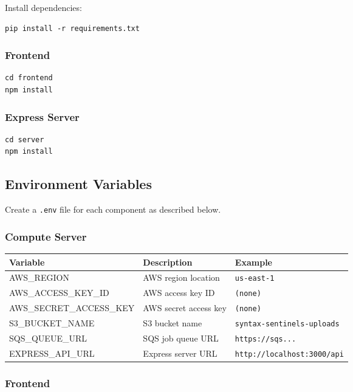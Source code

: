 \documentclass{article}
\begin{document}
Install dependencies:
\begin{Verbatim}[fontsize=\small]
pip install -r requirements.txt
\end{Verbatim}

\subsubsection*{Frontend}

\begin{Verbatim}[fontsize=\small]
cd frontend
npm install
\end{Verbatim}

\subsubsection*{Express Server}

\begin{Verbatim}[fontsize=\small]
cd server
npm install
\end{Verbatim}

\subsection{Environment Variables}

Create a \texttt{.env} file for each component as described below.

\subsubsection*{Compute Server}

\begin{tabularx}{\textwidth}{lXl}
\toprule
\textbf{Variable} & \textbf{Description} & \textbf{Example} \\
\midrule
AWS\_REGION & AWS region location & \texttt{us-east-1} \\
AWS\_ACCESS\_KEY\_ID & AWS access key ID & \texttt{(none)} \\
AWS\_SECRET\_ACCESS\_KEY & AWS secret access key & \texttt{(none)} \\
S3\_BUCKET\_NAME & S3 bucket name & \texttt{syntax-sentinels-uploads} \\
SQS\_QUEUE\_URL & SQS job queue URL & \texttt{https://sqs...} \\
EXPRESS\_API\_URL & Express server URL & \texttt{http://localhost:3000/api} \\
\bottomrule
\end{tabularx}

\subsubsection*{Frontend}
\end{document}
